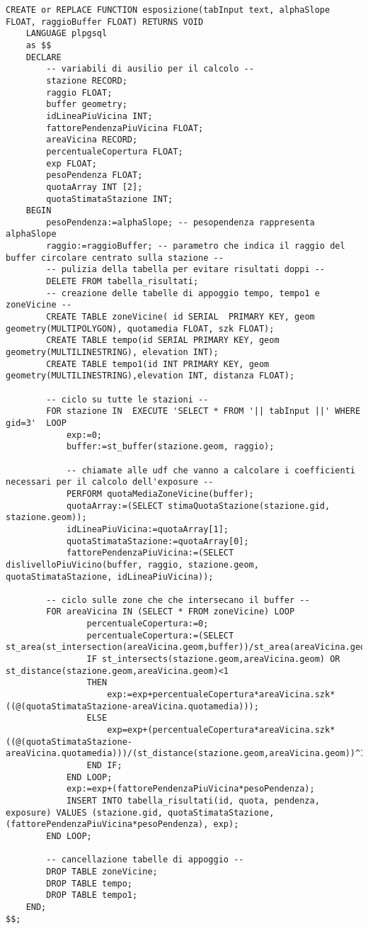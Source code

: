 \newpage
\begin{lstlisting}[style=mySQL]
CREATE or REPLACE FUNCTION esposizione(tabInput text, alphaSlope FLOAT, raggioBuffer FLOAT) RETURNS VOID
	LANGUAGE plpgsql
	as $$
	DECLARE
		-- variabili di ausilio per il calcolo --
		stazione RECORD;
		raggio FLOAT;
		buffer geometry;
		idLineaPiuVicina INT;
		fattorePendenzaPiuVicina FLOAT;
		areaVicina RECORD;
		percentualeCopertura FLOAT;
		exp FLOAT;
		pesoPendenza FLOAT;
		quotaArray INT [2];
		quotaStimataStazione INT;
	BEGIN
		pesoPendenza:=alphaSlope; -- pesopendenza rappresenta alphaSlope
		raggio:=raggioBuffer; -- parametro che indica il raggio del buffer circolare centrato sulla stazione --
		-- pulizia della tabella per evitare risultati doppi --
		DELETE FROM tabella_risultati;
		-- creazione delle tabelle di appoggio tempo, tempo1 e zoneVicine --
		CREATE TABLE zoneVicine( id SERIAL  PRIMARY KEY, geom geometry(MULTIPOLYGON), quotamedia FLOAT, szk FLOAT);
		CREATE TABLE tempo(id SERIAL PRIMARY KEY, geom geometry(MULTILINESTRING), elevation INT);
		CREATE TABLE tempo1(id INT PRIMARY KEY, geom geometry(MULTILINESTRING),elevation INT, distanza FLOAT);

		-- ciclo su tutte le stazioni --
		FOR stazione IN  EXECUTE 'SELECT * FROM '|| tabInput ||' WHERE gid=3'  LOOP
			exp:=0;
			buffer:=st_buffer(stazione.geom, raggio);

			-- chiamate alle udf che vanno a calcolare i coefficienti necessari per il calcolo dell'exposure --
			PERFORM quotaMediaZoneVicine(buffer);
			quotaArray:=(SELECT stimaQuotaStazione(stazione.gid, stazione.geom));
			idLineaPiuVicina:=quotaArray[1];
			quotaStimataStazione:=quotaArray[0];
			fattorePendenzaPiuVicina:=(SELECT dislivelloPiuVicino(buffer, raggio, stazione.geom, quotaStimataStazione, idLineaPiuVicina));

		-- ciclo sulle zone che che intersecano il buffer --
		FOR areaVicina IN (SELECT * FROM zoneVicine) LOOP
				percentualeCopertura:=0;
				percentualeCopertura:=(SELECT st_area(st_intersection(areaVicina.geom,buffer))/st_area(areaVicina.geom));
				IF st_intersects(stazione.geom,areaVicina.geom) OR st_distance(stazione.geom,areaVicina.geom)<1
				THEN
					exp:=exp+percentualeCopertura*areaVicina.szk*((@(quotaStimataStazione-areaVicina.quotamedia)));
				ELSE
					exp=exp+(percentualeCopertura*areaVicina.szk*((@(quotaStimataStazione-areaVicina.quotamedia)))/(st_distance(stazione.geom,areaVicina.geom))^1);
				END IF;
			END LOOP;
			exp:=exp+(fattorePendenzaPiuVicina*pesoPendenza);
			INSERT INTO tabella_risultati(id, quota, pendenza, exposure) VALUES (stazione.gid, quotaStimataStazione, (fattorePendenzaPiuVicina*pesoPendenza), exp);
		END LOOP;

		-- cancellazione tabelle di appoggio --
		DROP TABLE zoneVicine;
		DROP TABLE tempo;
		DROP TABLE tempo1;
	END;
$$;
\end{lstlisting}